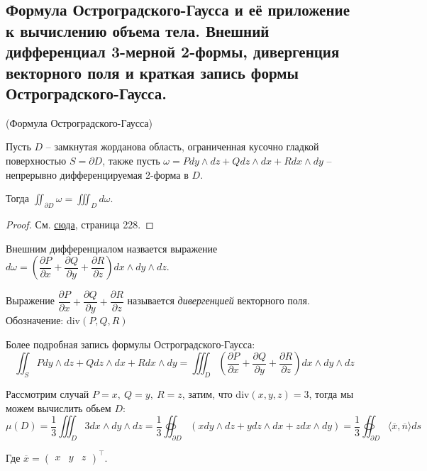 \subsection{Формула Остроградского-Гаусса и её приложение к вычислению объема тела. Внешний дифференциал 3-мерной 2-формы, дивергенция векторного поля и краткая запись формы Остроградского-Гаусса.}

\begin{theorem*}
    (Формула Остроградского-Гаусса)

    Пусть $D$ -- замкнутая жорданова область, ограниченная кусочно гладкой поверхностью $S = \partial D$, также
    пусть $\omega = P dy \wedge dz + Q dz \wedge dx + R dx \wedge dy$ -- непрерывно дифференцируемая 2-форма в $D$.

    Тогда $\iint_{\partial D} \omega = \iiint_{D} d\omega$.

\end{theorem*}

\begin{proof}
    См. \href{https://drive.google.com/file/d/1FxWvJSWedEf2lZ2jY8S7vkcWpLBmSr9d/view}{сюда}, страница 228.
\end{proof}

\begin{definition*}
    Внешним дифференциалом назвается выражение $d\omega = \left(\dfrac{\partial P}{\partial x} + \dfrac{\partial Q}{\partial y} + \dfrac{\partial R}{\partial z}\right) dx \wedge dy \wedge dz$.
\end{definition*}

\begin{definition*}
    Выражение $\dfrac{\partial P}{\partial x} + \dfrac{\partial Q}{\partial y} + \dfrac{\partial R}{\partial z}$ называется \textit{дивергенцией} векторного поля. Обозначение: div$(P, Q, R)$
\end{definition*}

Более подробная запись формулы Остроградского-Гаусса: $$\iint_{S} P dy \wedge dz + Q dz \wedge dx + R dx \wedge dy = \iiint_{D}\left(\dfrac{\partial P}{\partial x} + \dfrac{\partial Q}{\partial y} + \dfrac{\partial R}{\partial z}\right) dx \wedge dy \wedge dz$$

Рассмотрим случай $P = x,\ Q = y,\ R = z$, затим, что div$(x, y, z) = 3$, тогда мы можем вычислить обьем $D$:
$$\mu(D) = \dfrac{1}{3} \iiint_{D} 3 dx \wedge dy \wedge dz = \dfrac{1}{3}\oiint_{\partial D} \left(x dy \wedge dz + y dz \wedge dx + z dx \wedge dy\right) = \dfrac{1}{3}\oiint_{\partial D} \langle \overline x, \overline n\rangle ds$$

Где $\overline x = \begin{pmatrix}
	x & y & z
\end{pmatrix}^\top$.

